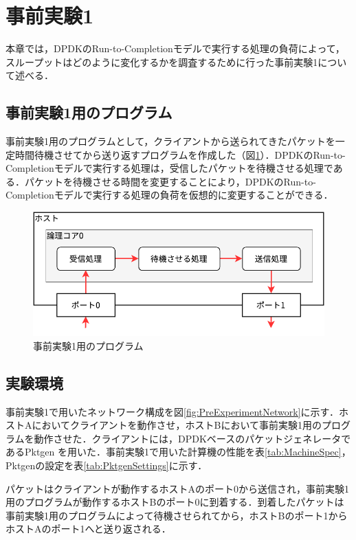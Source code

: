 \section{事前実験1}
\label{sec:PreExperimentOne}
本章では，DPDKのRun-to-Completionモデルで実行する処理の負荷によって，スループットはどのように変化するかを調査するために行った事前実験1について述べる．

\subsection{事前実験1用のプログラム}
事前実験1用のプログラムとして，クライアントから送られてきたパケットを一定時間待機させてから送り返すプログラムを作成した（図\ref{fig:PreExperimentOne}）．DPDKのRun-to-Completionモデルで実行する処理は，受信したパケットを待機させる処理である．パケットを待機させる時間を変更することにより，DPDKのRun-to-Completionモデルで実行する処理の負荷を仮想的に変更することができる．

\begin{figure}[htb]
  \centering
  \includegraphics[width=\columnwidth]{pictures/PreExperimentOne.pdf}
  \caption{事前実験1用のプログラム}
  \label{fig:PreExperimentOne}
\end{figure}

\subsection{実験環境}
事前実験1で用いたネットワーク構成を図\ref{fig:PreExperimentNetwork}に示す．ホストAにおいてクライアントを動作させ，ホストBにおいて事前実験1用のプログラムを動作させた．クライアントには，DPDKベースのパケットジェネレータであるPktgen \cite{Pktgen} を用いた．事前実験1で用いた計算機の性能を表\ref{tab:MachineSpec}，Pktgenの設定を表\ref{tab:PktgenSettings}に示す．

パケットはクライアントが動作するホストAのポート0から送信され，事前実験1用のプログラムが動作するホストBのポート0に到着する．到着したパケットは事前実験1用のプログラムによって待機させられてから，ホストBのポート1からホストAのポート1へと送り返される．

